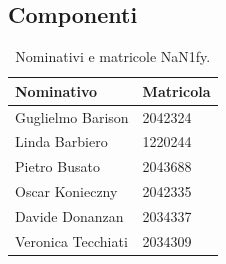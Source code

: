 \documentclass[8pt]{article}
\begin{document}
\subsection{Componenti}
\begin{table}[ht!]
	\centering
	\begin{tabular}{p{3cm} p{3cm}}
		\toprule
		\textbf{Nominativo} & \textbf{Matricola} \\
		\midrule
		Guglielmo Barison & 2042324 \\
		Linda Barbiero &  1220244 \\
		Pietro Busato & 2043688 \\
		Oscar Konieczny & 2042335 \\
		Davide Donanzan & 2034337 \\
		Veronica Tecchiati & 2034309 \\
		\bottomrule
	\end{tabular}
	\caption{Nominativi e matricole NaN1fy.}
	\label{table:Nominativi e matricole NaN1fy}
\end{table}
\end{document}
